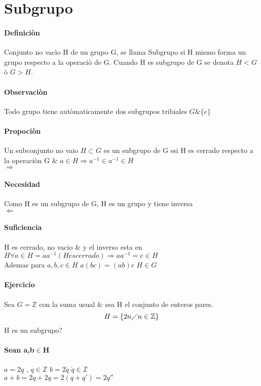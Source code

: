 \newpage
\section{Subgrupo}
\paragraph{Definici\`on}
  Conjunto no vac\`io H de un grupo G, se llama Subgrupo si H mismo forma un grupo respecto a la operaci\`{o} de G.
  Cuando H es subgrupo de G se denota $H< G$  \`{o} $G> H$.
  \paragraph{Observaci\`on}
  Todo grupo tiene aut\`omaticamente dos subgrupos tribiales  $G \& \{ e \} $
    \paragraph{Propoci\`on}
  Un subconjunto no vaio $H\subset G$ es un subgrupo de G ssi H es cerrado respecto a la operaci\`{o}n G \& $a\in H\Rightarrow a^{-1}\in a^{-1}\in H$ 
  \\ $\Rightarrow$ \paragraph{Necesidad} Como H es un subgrupo de G, H es un grupo y tiene inversa
  \\  $\Leftarrow$ \paragraph{Suficiencia} H es cerrado, no vacio \& y el  inverso esta en $H\forall a\in H=aa^{-1}(H es cerrado)\Rightarrow aa^{-1}=e\in H$ 
  \\
  Ademas para $a,b,c\in H$  $a(bc)=(ab)c$ $H\in G$

  \paragraph{Ejercicio} Sea $G=\mathbb{Z} $ con la  suma usual \& sea H el conjunto de enteros pares.
  \\ \[H=\{2n\diagup n\in \mathbb{Z} \}   \] H es un subgrupo?
  \paragraph{Sean a,b$\in$H} 
  $a=2q$ , $q\in \mathbb{Z} $  $b=2\acute{q}$ $\acute{q}\in \mathbb{Z}  $
  \\
  $a+b=2q+2q=2(q+q')=2q'' $
  
